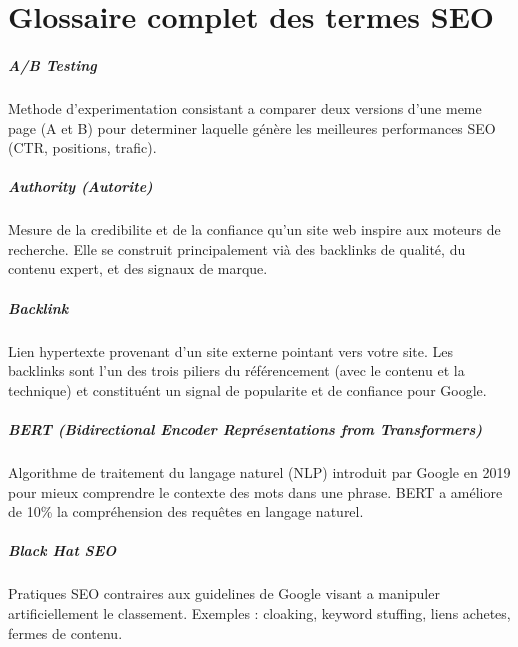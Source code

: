 \documentclass[12pt,a4paper,twoside]{report}
\begin{document}
\chapter*{Glossaire complet des termes SEO}

\onehalfspacing

\paragraph*{A/B Testing}
Methode d'experimentation consistant a comparer deux versions d'une meme page (A et B) pour determiner laquelle génère les meilleures performances SEO (CTR, positions, trafic).

\paragraph*{Authority (Autorite)}
Mesure de la credibilite et de la confiance qu'un site web inspire aux moteurs de recherche. Elle se construit principalement vià des backlinks de qualité, du contenu expert, et des signaux de marque.

\paragraph*{Backlink}
Lien hypertexte provenant d'un site externe pointant vers votre site. Les backlinks sont l'un des trois piliers du référencement (avec le contenu et la technique) et constituént un signal de popularite et de confiance pour Google.

\paragraph*{BERT (Bidirectional Encoder Représentations from Transformers)}
Algorithme de traitement du langage naturel (NLP) introduit par Google en 2019 pour mieux comprendre le contexte des mots dans une phrase. BERT a améliore de 10\% la compréhension des requêtes en langage naturel.

\paragraph*{Black Hat SEO}
Pratiques SEO contraires aux guidelines de Google visant a manipuler artificiellement le classement. Exemples : cloaking, keyword stuffing, liens achetes, fermes de contenu.
\end{document}
